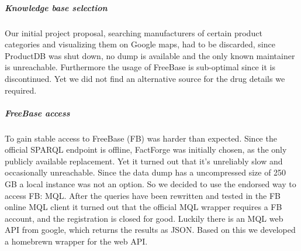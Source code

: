 \documentclass[11pt,titlepage,oneside,openany]{book}
\begin{document}
\label{challenges}

\subparagraph{Knowledge base selection} Our initial project proposal, searching manufacturers of certain product categories and visualizing them on Google maps, had to be discarded, since ProductDB was shut down, no dump is available and the only known maintainer is unreachable. Furthermore the usage of FreeBase is sub-optimal since it is discontinued. Yet we did not find an alternative source for the drug details we required. 


\subparagraph{FreeBase access}
\label{challenges:fb}
To gain stable access to FreeBase (FB) was harder than expected. Since the official SPARQL endpoint is offline, FactForge was initially chosen, as the only publicly available replacement. Yet it turned out that it's unreliably slow and occasionally unreachable. Since the data dump has a uncompressed size of 250 GB a local instance was not an option. 
So we decided to use the endorsed way to access FB: MQL. After the queries have been rewritten and tested in the FB online MQL client it turned out that the official MQL wrapper requires a FB account, and the registration is closed for good.
Luckily there is an MQL web API from google, which returns the results as JSON. Based on this we developed a homebrewn wrapper for the web API.



\appendix

\newpage
\end{document}
